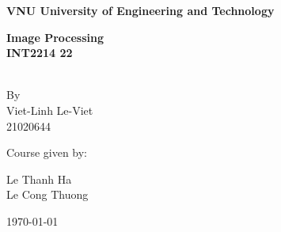 \documentclass[12pt]{report}
\author{Viet-Linh Le-Viet}
\numberwithin{figure}{chapter}
\begin{document}
\begin{titlepage}
\begin{center}

    
    {\textbf{VNU University of Engineering and Technology\\}}
    \vspace*{1.0cm}

    \vspace{0.5cm}
    {\textbf{Image Processing\\}}
    \vspace{0.3cm}
    {\textbf{INT2214 22\\}}
    \vspace{1.4cm}
    
    {}\\
    By\\
    Viet-Linh Le-Viet \\ 21020644\\
    \vspace{0.9cm}
    {\begin{singlespace}Course given by:\\\end{singlespace}}
    {\begin{singlespace} Le Thanh Ha\\
    Le Cong Thuong\\\end{singlespace}}


\end{center}
{\vfill{
 \begin{center}
  \today\\
 \end{center}
}\par
}
\end{titlepage}
\end{document}
